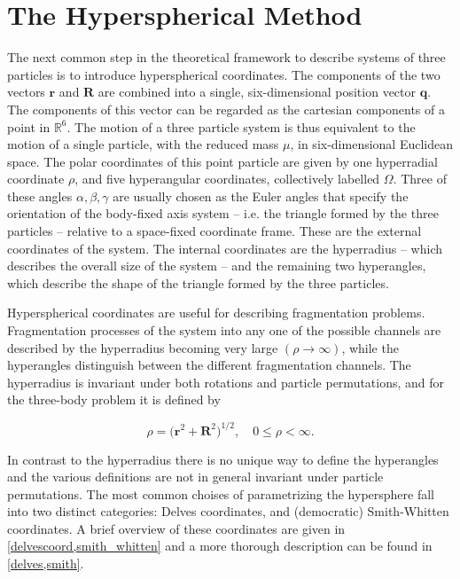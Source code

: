 \section{The Hyperspherical Method}
The next common step in the theoretical framework to describe systems of three particles is to introduce hyperspherical coordinates. The components of the two vectors $\mathbf{r}$ and $\mathbf{R}$ are combined into a single, six-dimensional position vector $\mathbf{q}$. The components of this vector can be regarded as the cartesian components of a point in $\mathbb{R}^{6}$. The motion of a three particle system is thus equivalent to the motion of a single particle, with the reduced mass $\mu$, in six-dimensional Euclidean space. The polar coordinates of this point particle are given by one hyperradial coordinate $\rho$, and five hyperangular coordinates, collectively labelled $\Omega$. Three of these angles $\alpha, \beta, \gamma$ are usually chosen as the Euler angles that specify the  orientation of the body-fixed axis system -- i.e. the triangle formed by the three particles -- relative to a space-fixed coordinate frame. These are the external coordinates of the system. The internal coordinates are the hyperradius -- which describes the overall size of the system -- and the remaining two hyperangles, which describe the shape of the triangle formed by the  three particles. 

Hyperspherical coordinates are useful for describing fragmentation problems. Fragmentation processes of the system into any one of the possible channels are described by the hyperradius becoming very large $(\rho \rightarrow \infty)$, while the hyperangles distinguish between the different fragmentation channels. The hyperradius is invariant under both rotations and particle permutations, and for the three-body problem it is defined by

\begin{equation}
\rho = \Big(\mathbf{r}^{2} + \mathbf{R}^{2}\Big)^{1/2}, \quad 0\leq \rho < \infty.
\end{equation} 

In contrast to the hyperradius there is no unique way to define the hyperangles and the various definitions are not in general invariant under particle permutations. The most common choises of parametrizing the hypersphere fall into two distinct categories: Delves coordinates, and (democratic) Smith-Whitten coordinates. A brief overview of these coordinates are given in \cref{delvescoord,smith_whitten} and a more thorough description can be found in \cref{delves,smith}.

